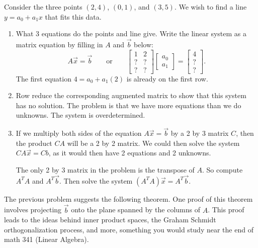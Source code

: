\begin{problem}
Consider the three points $(2,4)$, $(0,1)$, and $(3,5)$. We wish to find a line $y=  a_0+a_1 x$ that fits this data.  
\begin{enumerate}
 \item What 3 equations do the points and line give.  Write the linear system as a matrix equation by filling in $A$ and $\vec b$ below:
 $$A\vec x=\vec b\quad\quad\text{or}\quad \quad\begin{bmatrix}1&2\\ ? &? \\ ?&? \end{bmatrix}\begin{bmatrix}a_0\\a_1\end{bmatrix}=\begin{bmatrix}4\\ ? \\ ? \end{bmatrix}.$$
 The first equation $4=a_0+a_1(2)$ is already on the first row.
 \item Row reduce the corresponding augmented matrix to show that this system has no solution. The problem is that we have more equations than we do unknowns. The system is overdetermined. 
 \item If we multiply both sides of the equation $A\vec x = \vec b$ by a 2 by 3 matrix $C$, then the product $CA$ will be a 2 by 2 matrix. We could then solve the system $CA\vec x = Cb$, as it would then have 2 equations and 2 unknowns. 

The only 2 by 3 matrix in the problem is the transpose of $A$.  So compute $A^TA$ and $A^T\vec b$.  Then solve the system $(A^T A)\vec x = A^T \vec b$. 
\end{enumerate}

\end{problem}

The previous problem suggests the following theorem.  One proof of this theorem involves projecting $\vec b$ onto the plane spanned by the columns of $A$. This proof leads to the ideas behind inner product spaces, the Graham Schmidt orthogonalization process, and more, something you would study near the end of math 341 (Linear Algebra).

